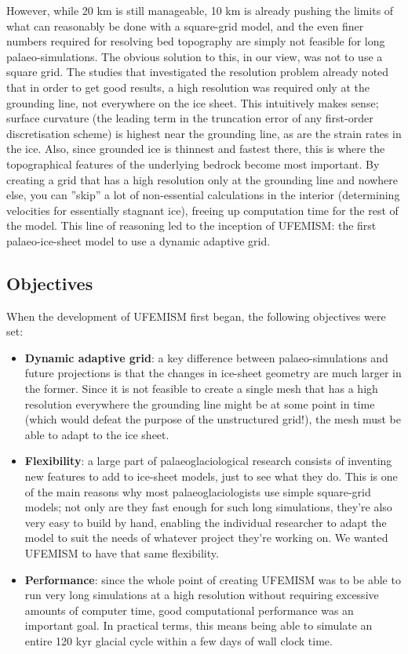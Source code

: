 \documentclass{article}
\begin{document}
However, while 20 km is still manageable, 10 km is already pushing the limits of what can reasonably be done with a square-grid model, and the even finer numbers required for resolving bed topography are simply not feasible for long palaeo-simulations. The obvious solution to this, in our view, was not to use a square grid. The studies that investigated the resolution problem already noted that in order to get good results, a high resolution was required only at the grounding line, not everywhere on the ice sheet. This intuitively makes sense; surface curvature (the leading term in the truncation error of any first-order discretisation scheme) is highest near the grounding line, as are the strain rates in the ice. Also, since grounded ice is thinnest and fastest there, this is where the topographical features of the underlying bedrock become most important. By creating a grid that has a high resolution only at the grounding line and nowhere else, you can ''skip'' a lot of non-essential calculations in the interior (determining velocities for essentially stagnant ice), freeing up computation time for the rest of the model. This line of reasoning led to the inception of UFEMISM: the first palaeo-ice-sheet model to use a dynamic adaptive grid.

\subsection{Objectives}

When the development of UFEMISM first began, the following objectives were set:

\begin{itemize}

\item \textbf{Dynamic adaptive grid}: a key difference between palaeo-simulations and future projections is that the changes in ice-sheet geometry are much larger in the former. Since it is not feasible to create a single mesh that has a high resolution everywhere the grounding line might be at some point in time (which would defeat the purpose of the unstructured grid!), the mesh must be able to adapt to the ice sheet.

\item \textbf{Flexibility}: a large part of palaeoglaciological research consists of inventing new features to add to ice-sheet models, just to see what they do. This is one of the main reasons why most palaeoglaciologists use simple square-grid models; not only are they fast enough for such long simulations, they're also very easy to build by hand, enabling the individual researcher to adapt the model to suit the needs of whatever project they're working on. We wanted UFEMISM to have that same flexibility.

\item \textbf{Performance}: since the whole point of creating UFEMISM was to be able to run very long simulations at a high resolution without requiring excessive amounts of computer time, good computational performance was an important goal. In practical terms, this means being able to simulate an entire 120 kyr glacial cycle within a few days of wall clock time.

\end{itemize}
\end{document}
